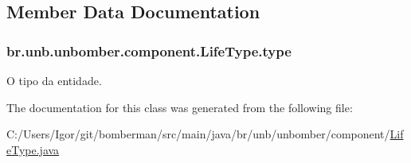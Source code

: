 \subsection{Member Data Documentation}
\hypertarget{classbr_1_1unb_1_1unbomber_1_1component_1_1_life_type_a0eef757b0cf6ff6b8b740b93f2a0bfa0}{
\subsubsection[{type}]{ br.\+unb.\+unbomber.\+component.\+Life\+Type.\+type\hspace{0.3cm}{\ttfamily [private]}}}\label{classbr_1_1unb_1_1unbomber_1_1component_1_1_life_type_a0eef757b0cf6ff6b8b740b93f2a0bfa0}


O tipo da entidade. 



The documentation for this class was generated from the following file\+:\begin{DoxyCompactItemize}
\item 
C\+:/\+Users/\+Igor/git/bomberman/src/main/java/br/unb/unbomber/component/\hyperlink{_life_type_8java}{Life\+Type.\+java}\end{DoxyCompactItemize}

